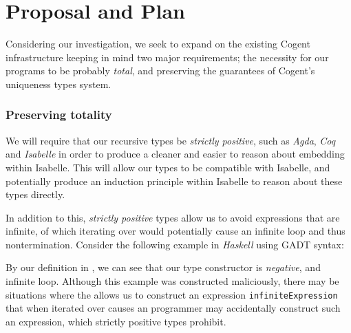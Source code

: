 \chapter{Proposal and Plan}\label{ch:style}

Considering our investigation, we seek to expand on the existing Cogent infrastructure keeping in mind
two major requirements; the necessity for our programs to be probably \textit{total}, and preserving the
guarantees of Cogent's uniqueness types system.

\subsection{Preserving totality}

We will require that our recursive types be \textit{strictly positive}, such as \textit{Agda},
\textit{Coq} and \textit{Isabelle} in order to produce a cleaner and easier to reason about
embedding within Isabelle. This will allow our types to be compatible with Isabelle, and potentially
produce an induction principle within Isabelle to reason about these types directly.

In addition to this, \textit{strictly positive} types allow us to avoid expressions that are infinite,
of which iterating over would potentially cause an infinite loop and thus nontermination. Consider
the following example in \textit{Haskell} using GADT syntax:

\pagebreak
\begin{center}
    
\end{center}

By our definition in , we can see that our type constructor is \textit{negative}, and
infinite loop. Although this example was constructed maliciously, there may be situations where the
allows us to construct an expression \verb|infiniteExpression| that when iterated over causes an
programmer may accidentally construct such an expression, which strictly positive types prohibit.